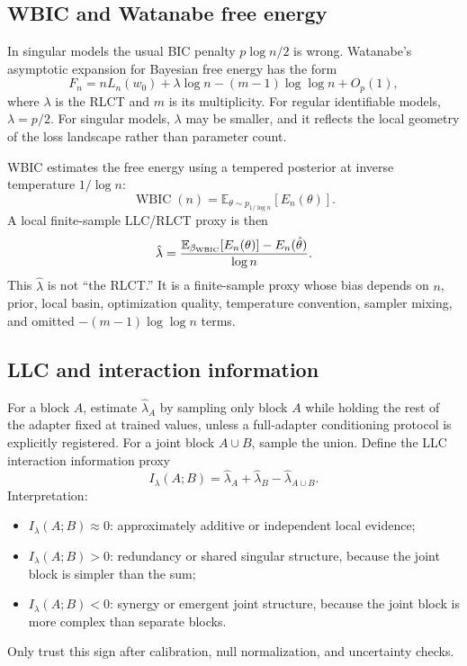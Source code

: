 \documentclass[11pt]{article}
\begin{document}
\subsection{WBIC and Watanabe free energy}

In singular models the usual BIC penalty $p\log n/2$ is wrong.  Watanabe's asymptotic expansion for Bayesian free energy has the form
\begin{equation}
  F_n
  = n L_n(w_0) + \lambda \log n - (m-1)\log\log n + O_p(1),
\end{equation}
where $\lambda$ is the RLCT and $m$ is its multiplicity.  For regular identifiable models, $\lambda=p/2$.  For singular models, $\lambda$ may be smaller, and it reflects the local geometry of the loss landscape rather than parameter count.

WBIC estimates the free energy using a tempered posterior at inverse temperature $1/\log n$:
\begin{equation}
  \operatorname{WBIC}(n)
  = \mathbb{E}_{\theta\sim p_{1/\log n}}
    [E_n(\theta)].
\end{equation}
A local finite-sample LLC/RLCT proxy is then
\begin{equation}
  \hat\lambda
  = \frac{\mathbb{E}_{\beta_{\rm WBIC}}[E_n(\theta)] - E_n(\hat\theta)}{\log n}.
\end{equation}
This $\hat\lambda$ is not ``the RLCT.''  It is a finite-sample proxy whose bias depends on $n$, prior, local basin, optimization quality, temperature convention, sampler mixing, and omitted $-(m-1)\log\log n$ terms.

\subsection{LLC and interaction information}

For a block $A$, estimate $\hat\lambda_A$ by sampling only block $A$ while holding the rest of the adapter fixed at trained values, unless a full-adapter conditioning protocol is explicitly registered.  For a joint block $A\cup B$, sample the union.  Define the LLC interaction information proxy
\begin{equation}
  I_\lambda(A;B)
  = \hat\lambda_A + \hat\lambda_B - \hat\lambda_{A\cup B}.
\end{equation}
Interpretation:
\begin{itemize}
\item $I_\lambda(A;B) \approx 0$: approximately additive or independent local evidence;
\item $I_\lambda(A;B) > 0$: redundancy or shared singular structure, because the joint block is simpler than the sum;
\item $I_\lambda(A;B) < 0$: synergy or emergent joint structure, because the joint block is more complex than separate blocks.
\end{itemize}
Only trust this sign after calibration, null normalization, and uncertainty checks.
\end{document}
